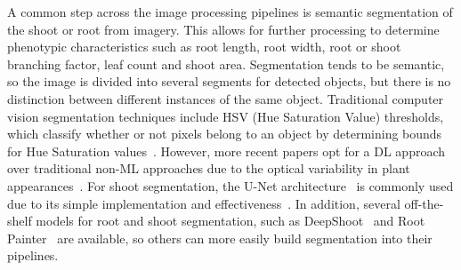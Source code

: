 A common step across the image processing pipelines is semantic segmentation of the shoot or root from imagery.
This allows for further processing to determine phenotypic characteristics such as root length, root width, root or shoot branching factor, leaf count and shoot area.
Segmentation tends to be semantic, so the image is divided into several segments for detected objects, but there is no distinction between different instances of the same object.
Traditional computer vision segmentation techniques include HSV (Hue Saturation Value) thresholds, which classify whether or not pixels belong to an object by determining bounds for Hue Saturation values~\cite{adamsPlantSegmentationSupervised2020}.
However, more recent papers opt for a DL approach over traditional non-ML approaches due to the optical variability in plant appearances~\cite{narisettiDeepLearningBased2022}.
For shoot segmentation, the U-Net architecture~\cite{ronnebergerUNetConvolutionalNetworks2015} is commonly used due to its simple implementation and effectiveness~\cite{narisettiDeepLearningBased2022, whiteGeneratingSegmentationMasks2020}.
In addition, several off-the-shelf models for root and shoot segmentation, such as DeepShoot~\cite{narisettiDeepLearningBased2022} and Root Painter~\cite{smithOotAinterDeep2022} are available, so others can more easily build segmentation into their pipelines.


